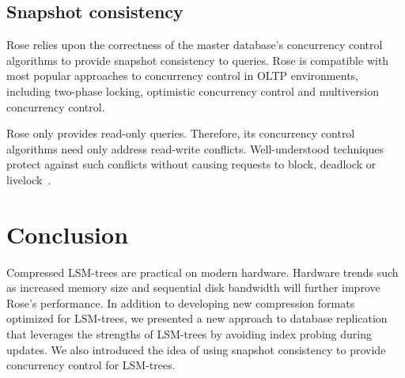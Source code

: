 \documentclass{vldb}
\newcommand{\rows}{Rose\xspace}
\newcommand{\rowss}{Rose's\xspace}
\begin{document}

\subsection{Snapshot consistency}

\rows relies upon the correctness of the master database's concurrency
control algorithms to provide snapshot consistency to queries.  \rows
is compatible with most popular approaches to concurrency control in
OLTP environments, including two-phase locking, optimistic concurrency
control and multiversion concurrency control.

\rows only provides read-only queries.  Therefore, its concurrency
control algorithms need only address read-write conflicts.
Well-understood techniques protect against such conflicts
without causing requests to block, deadlock or
livelock~\cite{concurrencyControl}.



\section{Conclusion}

Compressed LSM-trees are practical on modern hardware.  Hardware trends such as increased memory size and sequential disk bandwidth will further improve \rowss performance.  In addition
to developing new compression formats optimized for LSM-trees, we presented a new approach to
database replication that leverages the strengths of LSM-trees by
avoiding index probing during updates.  We also introduced the idea of
using snapshot consistency to provide concurrency control for
LSM-trees.
\end{document}

